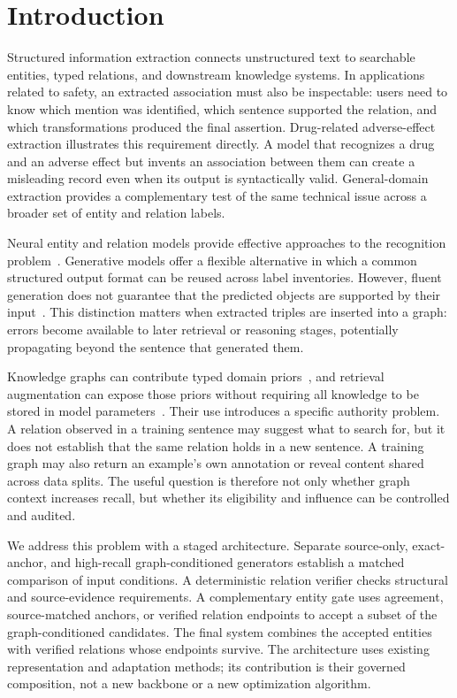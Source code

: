 \documentclass[preprint,12pt]{elsarticle}
\begin{document}
\section{Introduction}
\label{sec:introduction}
Structured information extraction connects unstructured text to searchable
entities, typed relations, and downstream knowledge systems. In applications
related to safety, an extracted association must also be inspectable: users
need to know which mention was identified, which sentence supported the
relation, and which transformations produced the final assertion. Drug-related
adverse-effect extraction illustrates this requirement directly. A model that
recognizes a drug and an adverse effect but invents an association between them
can create a misleading record even when its output is syntactically valid.
General-domain extraction provides a complementary test of the same technical
issue across a broader set of entity and relation labels.

Neural entity and relation models provide effective approaches to the
recognition problem~\cite{li2022ner,eberts2020spert}. Generative models offer a
flexible alternative in which a common structured output format can be reused
across label inventories. However, fluent generation does not guarantee that
the predicted objects are supported by their input~\cite{ji2023hallucination}.
This distinction matters when extracted triples are inserted into a graph:
errors become available to later retrieval or reasoning stages, potentially
propagating beyond the sentence that generated them.

Knowledge graphs can contribute typed domain priors~\cite{hogan2021kg}, and
retrieval augmentation can expose those priors without requiring all knowledge
to be stored in model parameters~\cite{lewis2020rag}. Their use introduces a
specific authority problem. A relation observed in a training sentence may
suggest what to search for, but it does not establish that the same relation
holds in a new sentence. A training graph may also return an example's own
annotation or reveal content shared across data splits. The useful question is
therefore not only whether graph context increases recall, but whether its
eligibility and influence can be controlled and audited.

We address this problem with a staged architecture. Separate source-only,
exact-anchor, and high-recall graph-conditioned generators establish a matched
comparison of input conditions. A deterministic relation verifier checks
structural and source-evidence requirements. A complementary entity gate uses
agreement, source-matched anchors, or verified relation endpoints to accept a
subset of the graph-conditioned candidates. The final system combines the
accepted entities with verified relations whose endpoints survive. The
architecture uses existing representation and adaptation methods; its
contribution is their governed composition, not a new backbone or a new
optimization algorithm.
\end{document}
